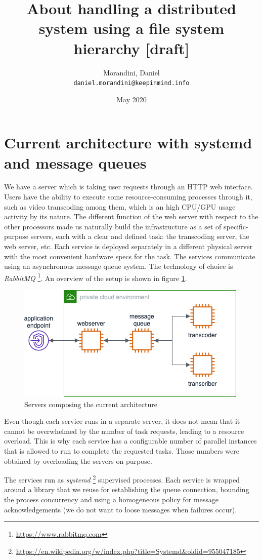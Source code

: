 \documentclass{article}
\title{About handling a distributed system using a file system hierarchy [draft]}
\author{Morandini, Daniel \\ \texttt{daniel.morandini@keepinmind.info}}
\date{May 2020}
\begin{document}
\maketitle
\section{Current architecture with systemd and message queues}
We have a server which is taking user requests through an HTTP web interface. Users have the ability to execute some resource-consuming processes through it, such as video transcoding among them, which is an high CPU/GPU usage activity by its nature.
The different function of the web server with respect to the other processors made us naturally build the infrastructure as a set of specific-purpose servers, each with a clear and defined task: the transcoding server, the web server, etc. Each service is deployed separately in a different physical server with the most convenient hardware specs for the task. The services communicate using an asynchronous message queue system. The technology of choice is \textit{RabbitMQ} \footnote{\url{https://www.rabbitmq.com}}. An overview of the setup is shown in figure \ref{fig:1}.
\begin{figure}[h]
    \centering
    \includegraphics[width=.6\textwidth]{current-cloud.png}
    \caption{Servers composing the current architecture}
    \label{fig:1}
\end{figure}
Even though each service runs in a separate server, it does not mean that it cannot be overwhelmed by the number of task requests, leading to a resource overload. This is why each service has a configurable number of parallel instances that is allowed to run to complete the requested tasks. Those numbers were obtained by overloading the servers on purpose.

The services run as \textit{systemd} \footnote{\url{https://en.wikipedia.org/w/index.php?title=Systemd&oldid=955047185}} supervised processes. Each service is wrapped around a library that we reuse for establishing the queue connection, bounding the process concurrency and using a homogeneous policy for message acknowledgements (we do not want to loose messages when failures occur).
\end{document}
